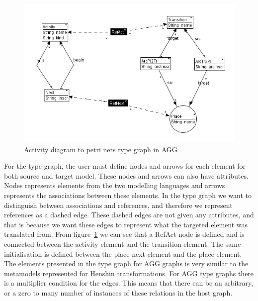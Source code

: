 \documentclass[pdftex,11pt,a4paper]{article}
\begin{document}
\begin{figure}[H]
	\centering
	\includegraphics[scale=0.7]{figures/AggTypeGraph.png}
	\caption{Activity diagram to petri nets type graph in AGG}
	\label{fig:AggTypeGraph}
\end{figure}

\indent For the type graph, the user must define nodes and arrows for each
element for both source and target model. These nodes and arrows can also have
attributes. Nodes represents elements from the two modelling languages and
arrows represents the associations between these elements. In the type graph we
want to distinguish between associations and references, and therefore we
represent references as a dashed edge. These dashed edges are not given any
attributes, and that is because we want these edges to represent what the
targeted element was translated from. From figure~\ref{fig:AggTypeGraph} we can
see that a RefAct node is defined and is connected between the activity
element and the transition element. The same initialisation is defined between
the place next element and the place element. The elements presented in the
type graph for AGG graphs is very similar to the metamodels represented for
Henshin transformations. For AGG type graphs there is a multiplier condition for
the edges. This means that there can be an arbitrary, or a zero to many number of
instances of these relations in the host graph.



\pagebreak
 

\end{document}
